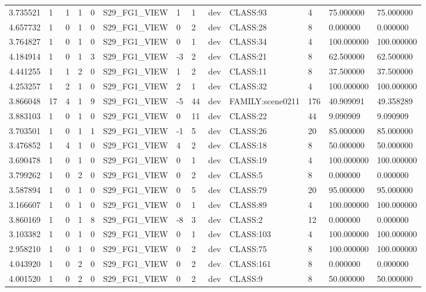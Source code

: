 \begin{tabular}{lllllllllllll}
3.735521 & 1 & 1 & 1 & 0 & S29\_FG1\_VIEW & 1 & 1 & dev & CLASS:93 & 4 & 75.000000 & 75.000000 \\
4.657732 & 1 & 0 & 1 & 0 & S29\_FG1\_VIEW & 0 & 2 & dev & CLASS:28 & 8 & 0.000000 & 0.000000 \\
3.764827 & 1 & 0 & 1 & 0 & S29\_FG1\_VIEW & 0 & 1 & dev & CLASS:34 & 4 & 100.000000 & 100.000000 \\
4.184914 & 1 & 0 & 1 & 3 & S29\_FG1\_VIEW & -3 & 2 & dev & CLASS:21 & 8 & 62.500000 & 62.500000 \\
4.441255 & 1 & 1 & 2 & 0 & S29\_FG1\_VIEW & 1 & 2 & dev & CLASS:11 & 8 & 37.500000 & 37.500000 \\
4.253257 & 1 & 2 & 1 & 0 & S29\_FG1\_VIEW & 2 & 1 & dev & CLASS:32 & 4 & 100.000000 & 100.000000 \\
3.866048 & 17 & 4 & 1 & 9 & S29\_FG1\_VIEW & -5 & 44 & dev & FAMILY:scene0211 & 176 & 40.909091 & 49.358289 \\
3.883103 & 1 & 0 & 1 & 0 & S29\_FG1\_VIEW & 0 & 11 & dev & CLASS:22 & 44 & 9.090909 & 9.090909 \\
3.703501 & 1 & 0 & 1 & 1 & S29\_FG1\_VIEW & -1 & 5 & dev & CLASS:26 & 20 & 85.000000 & 85.000000 \\
3.476852 & 1 & 4 & 1 & 0 & S29\_FG1\_VIEW & 4 & 2 & dev & CLASS:18 & 8 & 50.000000 & 50.000000 \\
3.690478 & 1 & 0 & 1 & 0 & S29\_FG1\_VIEW & 0 & 1 & dev & CLASS:19 & 4 & 100.000000 & 100.000000 \\
3.799262 & 1 & 0 & 2 & 0 & S29\_FG1\_VIEW & 0 & 2 & dev & CLASS:5 & 8 & 0.000000 & 0.000000 \\
3.587894 & 1 & 0 & 1 & 0 & S29\_FG1\_VIEW & 0 & 5 & dev & CLASS:79 & 20 & 95.000000 & 95.000000 \\
3.166607 & 1 & 0 & 1 & 0 & S29\_FG1\_VIEW & 0 & 1 & dev & CLASS:89 & 4 & 100.000000 & 100.000000 \\
3.860169 & 1 & 0 & 1 & 8 & S29\_FG1\_VIEW & -8 & 3 & dev & CLASS:2 & 12 & 0.000000 & 0.000000 \\
3.103382 & 1 & 0 & 1 & 0 & S29\_FG1\_VIEW & 0 & 1 & dev & CLASS:103 & 4 & 100.000000 & 100.000000 \\
2.958210 & 1 & 0 & 1 & 0 & S29\_FG1\_VIEW & 0 & 2 & dev & CLASS:75 & 8 & 100.000000 & 100.000000 \\
4.043920 & 1 & 0 & 2 & 0 & S29\_FG1\_VIEW & 0 & 2 & dev & CLASS:161 & 8 & 0.000000 & 0.000000 \\
4.001520 & 1 & 0 & 2 & 0 & S29\_FG1\_VIEW & 0 & 2 & dev & CLASS:9 & 8 & 50.000000 & 50.000000 \\

\end{tabular}
